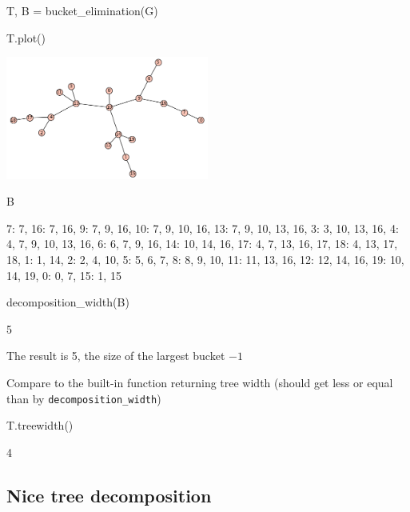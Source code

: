 \begin{sageCell}
    T, B = bucket_elimination(G)
\end{sageCell}
\begin{sageCell}
    T.plot()
\end{sageCell}
\begin{outImage}
   \includegraphics[width=0.5\textwidth]{Images/TreeDecomposition/bucket_elimination.png}
\end{outImage}

\begin{sageCell}
    B
\end{sageCell}
\begin{outCell}
    {7: {7},
     16: {7, 16},
     9: {7, 9, 16},
     10: {7, 9, 10, 16},
     13: {7, 9, 10, 13, 16},
     3: {3, 10, 13, 16},
     4: {4, 7, 9, 10, 13, 16},
     6: {6, 7, 9, 16},
     14: {10, 14, 16},
     17: {4, 7, 13, 16, 17},
     18: {4, 13, 17, 18},
     1: {1, 14},
     2: {2, 4, 10},
     5: {5, 6, 7},
     8: {8, 9, 10},
     11: {11, 13, 16},
     12: {12, 14, 16},
     19: {10, 14, 19},
     0: {0, 7},
     15: {1, 15}}
\end{outCell}

\begin{sageCell}
    decomposition_width(B)
\end{sageCell}
\begin{outCell}
    5
\end{outCell}
The result is 5, the size of the largest bucket $-1$

Compare to the built-in function returning tree width (should get less or equal than by \verb`decomposition_width`)
\begin{sageCell}
    T.treewidth()
\end{sageCell}
\begin{outCell}
    4
\end{outCell}


\subsection{Nice tree decomposition}

